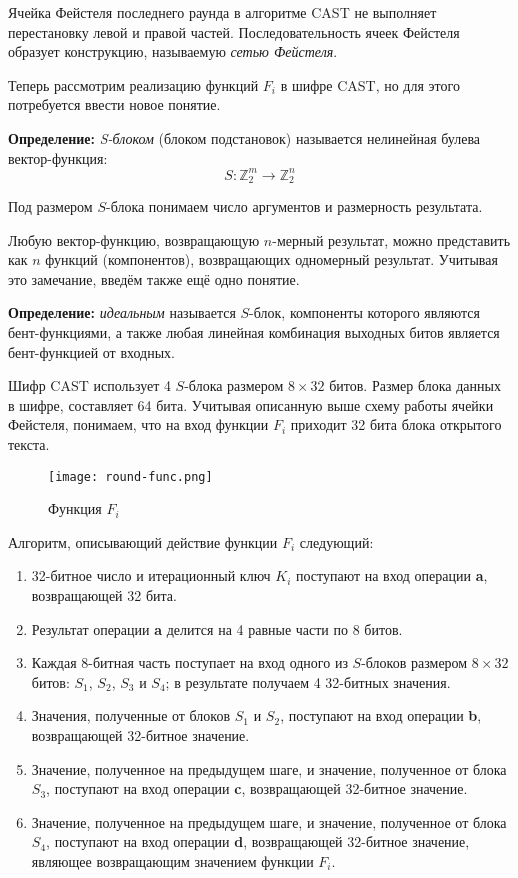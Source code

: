\documentclass[12pt, a4paper, reqno]{article}
\begin{document}
    Ячейка Фейстеля последнего раунда в алгоритме CAST не выполняет перестановку левой и правой
    частей. Последовательность ячеек Фейстеля образует конструкцию, называемую
    \textit{сетью Фейстеля}.

    Теперь рассмотрим реализацию функций $F_i$ в шифре CAST, но для этого потребуется ввести новое
    понятие.

    \textbf{Определение:} \textit{S-блоком} (блоком подстановок) называется нелинейная булева
    вектор-функция:
    \begin{equation*}
        S: \mathbb{Z}_2^m \to \mathbb{Z}_2^n
    \end{equation*}

    Под размером $S$-блока понимаем число аргументов и размерность результата.

    Любую вектор-функцию, возвращающую $n$-мерный результат, можно представить как $n$ функций
    (компонентов), возвращающих одномерный результат. Учитывая это замечание, введём также ещё одно
    понятие.

    \textbf{Определение:} \textit{идеальным} называется $S$-блок, компоненты которого являются
    бент-функциями, а также любая линейная комбинация выходных битов является бент-функцией от
    входных.

    Шифр CAST использует 4 $S$-блока размером $8 \times 32$ битов. Размер блока данных в шифре,
    составляет 64 бита. Учитывая описанную выше схему работы ячейки Фейстеля, понимаем, что на вход
    функции $F_i$ приходит 32 бита блока открытого текста.

    \begin{wrapfigure}{r}{0.3\textwidth}
        \centering
        \texttt{[image: round-func.png]}
        \caption{Функция $F_i$}
    \end{wrapfigure}

    Алгоритм, описывающий действие функции $F_i$ следующий:
    \begin{enumerate}
        \item 32-битное число и итерационный ключ $K_i$ поступают на вход операции \textbf{a},
              возвращающей 32 бита.
        \item Результат операции \textbf{a} делится на 4 равные части по 8 битов.
        \item Каждая 8-битная часть поступает на вход одного из $S$-блоков размером
              $8 \times 32$ битов: $S_1$, $S_2$, $S_3$ и $S_4$; в результате получаем 4 32-битных
              значения.
        \item Значения, полученные от блоков $S_1$ и $S_2$, поступают на вход операции \textbf{b},
              возвращающей 32-битное значение.
        \item Значение, полученное на предыдущем шаге, и значение, полученное от блока $S_3$,
              поступают на вход операции \textbf{c}, возвращающей 32-битное значение.
        \item Значение, полученное на предыдущем шаге, и значение, полученное от блока $S_4$,
              поступают на вход операции \textbf{d}, возвращающей 32-битное значение, являющее
              возвращающим значением функции $F_i$.
    \end{enumerate}
\end{document}
